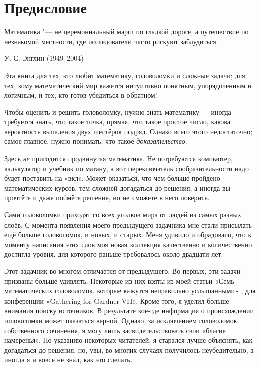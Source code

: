 \chapter*{Предисловие}

\setlength{\epigraphwidth}{.6\textwidth}
\epigraph{Математика "--- не церемониальный марш по гладкой дороге, а путешествие по незнакомой местности, где исследователи часто рискуют заблудиться.
}{У. С. Энглин (1949--2004)
}

Эта книга для тех, кто любит математику, головоломки и сложные задачи;
для тех, кому математический мир кажется интуитивно понятным, упорядоченным и логичным, и тех, кто готов убедиться в обратном!

Чтобы оценить и решить головоломку, нужно знать математику --- 
иногда требуется знать, что такое точка, прямая, что такое простое число, какова вероятность выпадения двух шестёрок подряд.
Однако всего этого недостаточно; самое главное, нужно понимать, что такое \emph{доказательство}.

Здесь \emph{не} пригодится продвинутая математика.
Не потребуются компьютер, калькулятор и учебник по матану,
а вот переключатель сообразительности надо будет поставить на «вкл».
Может оказаться, что чем больше пройдено математических курсов, тем сложней догадаться до решения,
а иногда вы прочтёте и даже поймёте решение, но не сможете в него поверить.

Сами головоломки приходят со всех уголков мира от людей из самых разных слоёв.
С момента появления моего предыдущего задачника мне стали присылать ещё больше головоломок, и новых, и старых.
Меня удивило и обрадовало, что к моменту написания этих слов моя новая коллекция качественно и количественно достигла уровня, для которого раньше требовалось около двадцати лет.

Этот задачник во многом отличается от предыдущего.
Во-первых, эти задачи призваны больше удивлять.
Некоторые из них взяты из моей статьи «Семь математических головоломок, которые кажутся неправильно услышанными» \cite{winkler-7}, для конференции «Gathering for Gard\-ner VII».
Кроме того, я уделил больше внимания поиску источников.
В результате кое-где информация о происхождении головоломки может оказаться верной.
Однако, за исключением головоломок собственного сочинения, я могу лишь засвидетельствовать свои «благие намеренья».
По указанию некоторых читателей, я старался лучше объяснять, как догадаться до решения,
но, увы, во многих случаях получилось неубедительно, а иногда я и вовсе не знал, как это сделать.

